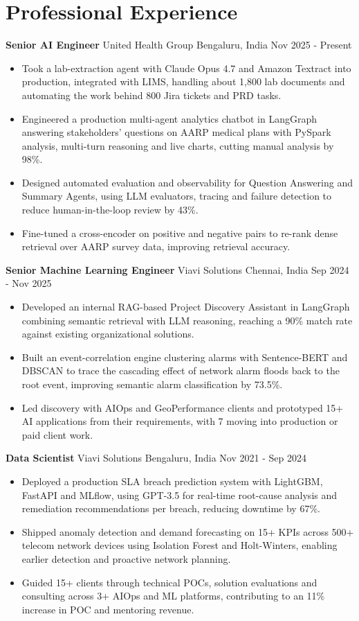 \documentclass[10pt,a4paper]{article}
\newcommand{\role}[4]{\textbf{#1} \textbar{} #2 \hfill #3 \textbar{} #4\par}
\begin{document}
\section{Professional Experience}
\role{Senior AI Engineer}{United Health Group}{Bengaluru, India}{Nov 2025 - Present}
\begin{itemize}
  \item Took a lab-extraction agent with Claude Opus 4.7 and Amazon Textract into production, integrated with LIMS, handling about 1,800 lab documents and automating the work behind 800 Jira tickets and PRD tasks.
  \item Engineered a production multi-agent analytics chatbot in LangGraph answering stakeholders' questions on AARP medical plans with PySpark analysis, multi-turn reasoning and live charts, cutting manual analysis by 98\%.
  \item Designed automated evaluation and observability for Question Answering and Summary Agents, using LLM evaluators, tracing and failure detection to reduce human-in-the-loop review by 43\%.
  \item Fine-tuned a cross-encoder on positive and negative pairs to re-rank dense retrieval over AARP survey data, improving retrieval accuracy.
\end{itemize}
\vspace{3pt}
\role{Senior Machine Learning Engineer}{Viavi Solutions}{Chennai, India}{Sep 2024 - Nov 2025}
\begin{itemize}
  \item Developed an internal RAG-based Project Discovery Assistant in LangGraph combining semantic retrieval with LLM reasoning, reaching a 90\% match rate against existing organizational solutions.
  \item Built an event-correlation engine clustering alarms with Sentence-BERT and DBSCAN to trace the cascading effect of network alarm floods back to the root event, improving semantic alarm classification by 73.5\%.
  \item Led discovery with AIOps and GeoPerformance clients and prototyped 15+ AI applications from their requirements, with 7 moving into production or paid client work.
\end{itemize}
\vspace{3pt}
\role{Data Scientist}{Viavi Solutions}{Bengaluru, India}{Nov 2021 - Sep 2024}
\begin{itemize}
  \item Deployed a production SLA breach prediction system with LightGBM, FastAPI and MLflow, using GPT-3.5 for real-time root-cause analysis and remediation recommendations per breach, reducing downtime by 67\%.
  \item Shipped anomaly detection and demand forecasting on 15+ KPIs across 500+ telecom network devices using Isolation Forest and Holt-Winters, enabling earlier detection and proactive network planning.
  \item Guided 15+ clients through technical POCs, solution evaluations and consulting across 3+ AIOps and ML platforms, contributing to an 11\% increase in POC and mentoring revenue.
\end{itemize}
\end{document}
